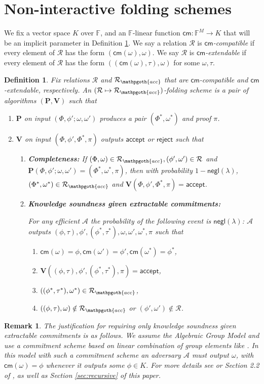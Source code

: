 \documentclass[11pt]{article} %
\newcommand{\F}{\ensuremath{\mathbb F}\xspace}
\newcommand{\adv}{\ensuremath{\mathcal A}\xspace}
\newcommand{\cm}{\ensuremath{\mathsf{cm}}\xspace}
\newcommand{\negl}{\ensuremath{\mathsf{negl}(\lambda)}\xspace}
\newcommand{\rej}{\ensuremath{\mathsf{reject}}\xspace}
\newcommand{\accept}{\ensuremath{\mathsf{accept}}\xspace}
\newcommand{\prv}{\ensuremath{\mathsf{\mathbf{P}}}\xspace}
\newcommand{\prf}{\ensuremath{\mathsf{\pi}}\xspace}
\newcommand{\inst}{\ensuremath{\phi}\xspace}
\newcommand{\wit}{\ensuremath{\mathsf{\omega}}\xspace}
\newcommand{\ver}{\ensuremath{\mathsf{\mathbf{V}}}\xspace}
\newcommand{\rel}{\ensuremath{\mathcal{R}}\xspace}
\newtheorem{dfn}[lemma]{Definition}
\newtheorem{remark}[lemma]{Remark}
\newcommand{\instt}{\ensuremath{\Phi^*}\xspace}
\newcommand{\insttbase}{\ensuremath{\Phi}\xspace}
\newcommand{\accscheme}[2]{$(#1\mapsto #2)$-folding scheme\xspace}
\newcommand{\accrel}{\ensuremath{\rel_{\mathpgoth{acc}}}\xspace}
\newcommand{\inststar}{\ensuremath{\inst^*}\xspace}
\newcommand{\witstar}{\ensuremath{\wit^*}\xspace}
\begin{document}
\section{Non-interactive folding schemes}\label{sec:folding}
We fix a vector space $K$ over \F, and an $\F$-linear function $\cm:\F^M\to K$ that will be an implicit parameter in Definition \ref{dfn:accschme}.
We say a relation \rel is \emph{\cm-compatible} if every element of \rel has the form $(\cm(\wit),\wit)$.
We say \rel is \emph{\cm-extendable} if every element of \rel has the form $((\cm(\wit),\tau),\wit)$ for some $\wit,\tau$.
\begin{dfn}\label{dfn:accschme}
Fix relations \rel and \accrel that are \cm-compatible and \cm-extendable, respectively. An \emph{\accscheme{\rel}{\accrel}} is a pair of algorithms $(\prv, \ver)$
such that

\begin{enumerate}
 \item \prv on input $(\insttbase,\inst';\wit,\wit')$ produces a pair $(\instt,\wit^*)$ and proof \prf.
 \item \ver on input $(\insttbase,\inst',\instt,\prf)$ outputs \accept or \rej such that
\begin{enumerate}
 \item \textbf{Completeness:} If $(\insttbase,\wit)\in \accrel, (\inst',\wit')\in \rel$ and $\prv(\insttbase,\inst';\wit,\wit')=(\instt,\witstar,\prf)$, then with probability $1-\negl$, $(\instt,\witstar)\in \accrel$ and $\ver(\insttbase,\inst',\instt,\prf)=\accept$.
\item \textbf{Knowledge soundness given extractable commitments:}

For any efficient \adv the probability of the following event is \negl:
\adv outputs $(\inst,\tau),\inst',(\inststar,\tau^*),\wit,\wit',\witstar,\prf$
such that
\begin{enumerate}
\item $\cm(\wit)=\inst,\cm(\wit')=\inst',\cm(\witstar)=\inststar$,
\item $\ver((\inst,\tau),\inst',(\inststar,\tau^*),\prf)=\accept$,
\item $((\inststar,\tau^*),\witstar)\in\accrel$,
\item $((\inst,\tau),\wit)\notin\accrel$ or $(\inst',\wit')\notin \rel$.
\end{enumerate}
\end{enumerate}
\end{enumerate}
\end{dfn}
\begin{remark}\label{rem:agm->ext commitments}
 The justification for requiring only knowledge soundness given extractable commitments is as follows.
 We assume the Algebraic Group Model \cite{agm} and use a commitment scheme based on linear combination of group elements like \cite{kate}.
 In this model with such a commitment scheme an adversary \adv must output \wit, with $\cm(\wit)=\inst$ whenever it outputs some $\inst\in K$.
 For more details see \cite{agm} or Section 2.2 of \cite{plonk}, as well as Section \ref{sec:recursive} of this paper.
\end{remark}
\end{document}
